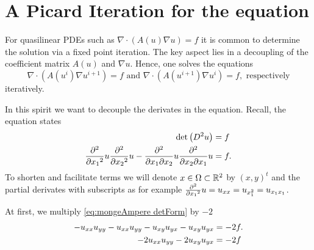 \section{A Picard Iteration for the \MA equation}

For quasilinear PDEs such as $\nabla \cdot (A(u) \nabla u ) = f$ it is common to determine the solution via a fixed point iteration. The key aspect lies in a decoupling of the coefficient matrix $A(u)$ and $\nabla u$. Hence, one solves the equations
\[
	\nabla \cdot (A(u^{i} )\nabla u^{i+1}) = f  \text{ and } \nabla \cdot (A(u^{i+1}) \nabla u^{i}) = f, \text{ respectively}
\] 
iteratively.

In this spirit we want to decouple the derivates in the \MA equation. Recall, the \MA equation states
\begin{align}
 \det{\left(D^2 u\right)} &= f \nonumber \\
 	\frac {\partial^2} {\partial {x_1}^2} u \frac {\partial^2} {\partial {x_2}^2} u -\frac {\partial^2} {\partial x_1\partial x_2} u \frac {\partial^2} {\partial x_2\partial x_1} u  &= f. \label{eq:mongeAmpere detForm}
\end{align}
To shorten and facilitate terms we will denote $x \in \Omega \subset {\mathbb{R}^2} $ by $(x,y)^t$ and the partial derivates with subscripts as for example $\frac {\partial^2} {\partial {x_1}^2} u = u_{xx} =  u_{x_1^2}  = u_{x_1 x_1}$.

At first, we multiply \eqref{eq:mongeAmpere detForm} by $-2$ 
\begin{align}
 	-u_{x x } u_{y y }-u_{x x } u_{y y } -u_{x y } u_{y x } -u_{x y } u_{y x } &=-2 f. \\
 	-2u_{x x } u_{y y }-2u_{x y } u_{y x }  &=-2 f
\end{align}


